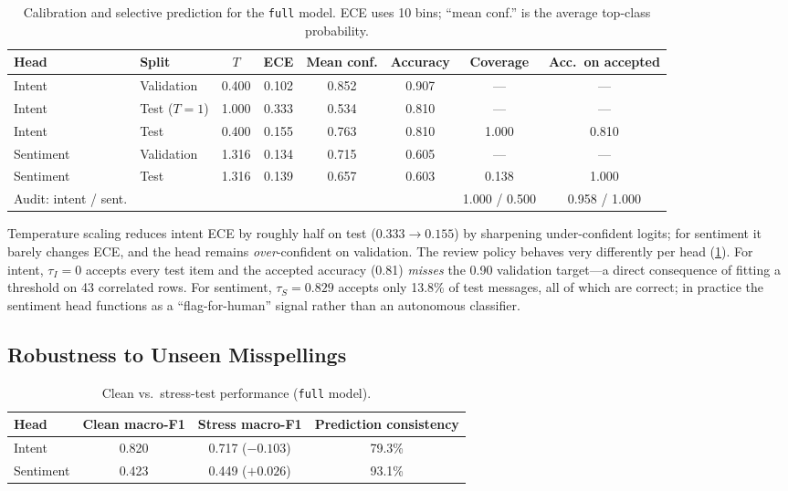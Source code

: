 \documentclass[11pt,a4paper]{article}
\theoremstyle{remark}
\newcommand{\lbl}[1]{\texttt{#1}}                      %
\begin{document}
\begin{table}[h]
\centering\small
\caption{Calibration and selective prediction for the \lbl{full} model.
ECE uses 10 bins; ``mean conf.'' is the average top-class probability.}
\label{tab:calib}
\begin{tabular}{@{}ll cccc cc@{}}
\toprule
Head & Split & $T$ & ECE & Mean conf. & Accuracy & Coverage & Acc.\ on accepted\\
\midrule
Intent    & Validation & 0.400 & 0.102 & 0.852 & 0.907 & --- & --- \\
Intent    & Test ($T{=}1$)   & 1.000 & 0.333 & 0.534 & 0.810 & --- & --- \\
Intent    & Test       & 0.400 & 0.155 & 0.763 & 0.810 & 1.000 & 0.810 \\
\midrule
Sentiment & Validation & 1.316 & 0.134 & 0.715 & 0.605 & --- & --- \\
Sentiment & Test       & 1.316 & 0.139 & 0.657 & 0.603 & 0.138 & 1.000 \\
Audit: intent / sent.  & & & & & & 1.000 / 0.500 & 0.958 / 1.000 \\
\bottomrule
\end{tabular}
\end{table}

Temperature scaling reduces intent ECE by roughly half on test ($0.333\to0.155$) by sharpening
under-confident logits; for sentiment it barely changes ECE, and the head
remains \emph{over}-confident on validation. The review policy behaves very
differently per head (\cref{tab:calib}). For intent, $\tau_I=0$ accepts every
test item and the accepted accuracy (0.81) \emph{misses} the 0.90 validation
target---a direct consequence of fitting a threshold on 43 correlated rows.
For sentiment, $\tau_S=0.829$ accepts only 13.8\% of test messages, all of which
are correct; in practice the sentiment head functions as a
``flag-for-human'' signal rather than an autonomous classifier.

\subsection{Robustness to Unseen Misspellings}

\begin{table}[h]
\centering\small
\caption{Clean vs.\ stress-test performance (\lbl{full} model).}
\label{tab:stress}
\begin{tabular}{@{}l ccc@{}}
\toprule
Head & Clean macro-F1 & Stress macro-F1 & Prediction consistency \\
\midrule
Intent    & 0.820 & 0.717 \textcolor{warn}{($-0.103$)} & 79.3\% \\
Sentiment & 0.423 & 0.449 \textcolor{okgreen}{($+0.026$)} & 93.1\% \\
\bottomrule
\end{tabular}
\end{table}
\end{document}
